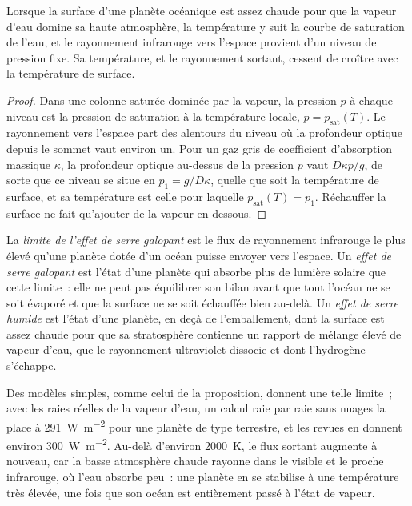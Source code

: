 \begin{proposition}\label{prop:b3:planetary-atmospheres:limit}
Lorsque la surface d'une planète océanique est assez chaude pour que la vapeur d'eau
domine sa haute atmosphère, la température y suit la
courbe de saturation de l'eau, et le rayonnement infrarouge vers l'espace provient
d'un niveau de pression fixe. Sa température, et le rayonnement sortant,
cessent de croître avec la température de surface.
\end{proposition}

\begin{proof}
Dans une colonne saturée dominée par la vapeur, la pression $p$ à chaque
niveau est la pression de saturation à la température locale, $p =
p_\mathrm{sat}(T)$. Le rayonnement vers l'espace part des alentours du niveau
où la profondeur optique depuis le sommet vaut environ un. Pour un gaz gris de
coefficient d'absorption massique $\kappa$, la profondeur optique au-dessus de la pression $p$
vaut $D\kappa p/g$, de sorte que ce niveau se situe en $p_1 = g/D\kappa$, quelle que soit la
température de surface, et sa température est celle pour laquelle
$p_\mathrm{sat}(T) = p_1$. Réchauffer la surface ne fait qu'ajouter de la vapeur en dessous.
\end{proof}

\begin{definition}\label{def:b3:planetary-atmospheres:runaway}
La \emph{limite de l'effet de serre galopant} est le
flux de rayonnement infrarouge le plus élevé qu'une planète dotée d'un océan puisse envoyer vers
l'espace. Un \emph{effet de serre galopant} est l'état
d'une planète qui absorbe plus de lumière solaire que cette limite~: elle ne peut pas équilibrer son
bilan avant que tout l'océan ne se soit évaporé et que la surface ne se soit
échauffée bien au-delà. Un \emph{effet de serre humide}
est l'état d'une planète, en deçà de l'emballement, dont la surface est assez chaude
pour que sa stratosphère contienne un rapport de mélange élevé de vapeur d'eau,
que le rayonnement ultraviolet dissocie et dont l'hydrogène s'échappe.
\end{definition}

Des modèles simples, comme celui de la proposition, donnent une telle limite~; avec les
raies réelles de la vapeur d'eau, un calcul raie par raie sans nuages
la place à \qty{291}{W.m^{-2}} pour une planète de type terrestre, et
les revues en donnent environ \qty{300}{W.m^{-2}}. Au-delà d'environ \qty{2000}{K}, le
flux sortant augmente à nouveau, car la basse atmosphère chaude rayonne dans le
visible et le proche infrarouge, où l'eau absorbe peu~: une planète en
 se stabilise à une température très élevée, une fois que son océan
est entièrement passé à l'état de vapeur.


